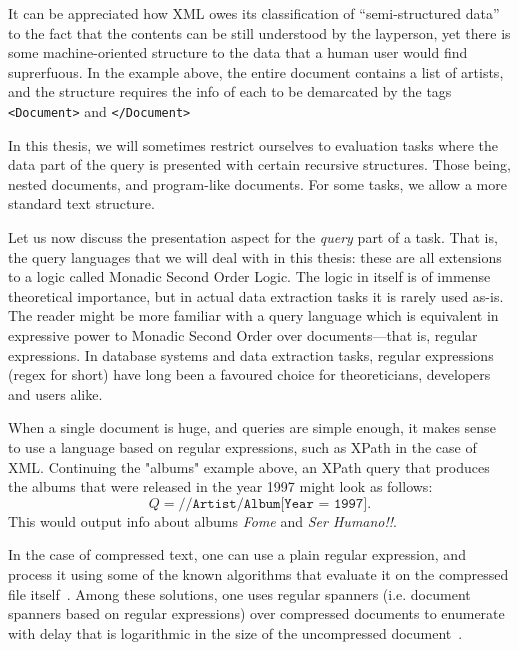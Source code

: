 It can be appreciated how XML owes its classification of ``semi-structured data'' to the fact that the contents can be still understood by the layperson, yet there is some machine-oriented structure to the data that a human user would find suprerfuous. In the example above, the entire document contains a list of artists, and the structure requires  the info of each to be demarcated by the tags {\tt <Document>} and {\tt </Document>}


In this thesis, we will sometimes restrict ourselves to evaluation tasks where the data part of the query is presented with certain recursive structures. Those being, nested documents, and program-like documents. For some tasks, we allow a more standard text structure.

Let us now discuss the presentation aspect for the {\em query} part of a task. That is, the query languages that we will deal with in this thesis: these are all extensions to a logic called Monadic Second Order Logic. The logic in itself is of immense theoretical importance, but in actual data extraction tasks it is rarely used as-is. The reader might be more familiar with a query language which is equivalent in expressive power to Monadic Second Order over documents---that is, regular expressions. In database systems and data extraction tasks, regular expressions (regex for short) have long been a favoured choice for theoreticians, developers and users alike. 

When a single document is huge, and queries are simple enough, it makes sense to use a language based on regular expressions, such as XPath in the case of XML. 
Continuing the "albums" example above, an XPath query that produces the albums that were released in the year 1997 might look as follows: 
$$Q = \texttt{//Artist/Album[Year = 1997]}.$$
This would output info about albums {\it Fome} and {\it Ser Humano!!}.

In the case of compressed text, one can use a plain regular expression, and process it using some of the known algorithms that evaluate it on the compressed file itself~\cite{Lohrey12}. Among these solutions, one uses regular spanners (i.e. document spanners based on regular expressions) over compressed documents to enumerate with delay that is logarithmic in the size of the uncompressed document~\cite{SchmidS21}.


